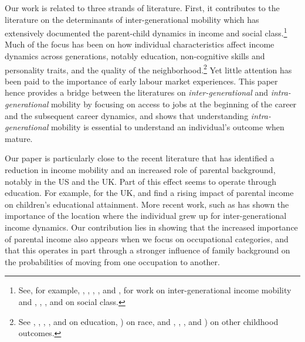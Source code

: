 Our work is related to three strands of literature. 
First, it contributes to the literature on the determinants of inter-generational mobility which has extensively documented the parent-child dynamics in income and social class.\footnote{See, for example, \citet{Nicoletti2007Intergenerational}, \citet{Kopczuk2010Earnings}, \citet{Blanden2013Intergenerational}, \citet{Long2013Intergenerational}, and  \citet{Chetty2014United}, \citet{Chetty2017Fading} for work on inter-generational income mobility and \citet{Erikson1992Constant}, \citet{Chan2007Class}, \citet{Goldthorpe2007Intergenerational}, and \citet{Erikson2010Social} on social class.} Much of the focus has been on how individual characteristics affect income dynamics across generations, notably education,  non-cognitive skills and personality traits, and the quality of the neighborhood.\footnote{See \citealt{Bjorklund2012Important}, \citealt{Blanden2014Education}, \citealt{Blanden2016Educational}, \citealt{Crawford2016Higher}, and \citealt{Neidhofer2018Educational} on education, \citealt{Chetty2020Race} ) on race, and \citealt{Heckman2006Effects}, \citealt{Blanden2007Accounting}, \citealt{Heckman2013Understanding}, and \citealt{Chetty2014Land}) on other childhood outcomes.} Yet little attention has been paid to the importance of early labour market experiences. This paper hence provides a bridge between the literatures on \textit{inter-generational} and \textit{intra-generational} mobility by focusing on access to jobs at the beginning of the career and the subsequent career dynamics, and shows that understanding \textit{intra-generational} mobility is essential to understand an individual's outcome when mature. 

Our paper is particularly close to the recent literature that has identified a reduction in income mobility and an increased role of parental background, notably in the US and the UK. Part of this effect seems to operate through education. For example, for the UK, \citet{Blanden2004Family} and \citet{Gregg2010Family} find a rising impact of parental income on children's educational attainment. More recent work, such as \citealt{Chetty2014United} has shown the importance of the location where the individual grew up for inter-generational income dynamics. Our contribution lies in showing that the increased importance of parental income also appears when we focus on occupational categories, and that this operates in part through a stronger influence of family background on the probabilities of moving from one occupation to another.

